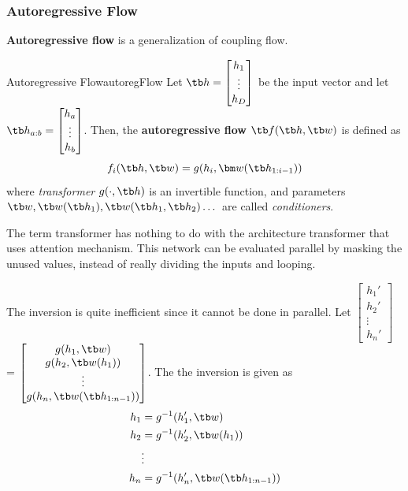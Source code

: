 \documentclass{article}
\begin{document}
            

        \subsubsection{Autoregressive Flow}
            \textbf{Autoregressive flow} is a generalization of coupling flow.
            \begin{defn}{Autoregressive Flow}{autoregFlow}
                Let $\tb h=\begin{bmatrix} h_1 \\ \vdots \\ h_D\end{bmatrix}$ be the input vector
                and let $\tb h_{a:b} = \begin{bmatrix} h_a \\ \vdots \\ h_b\end{bmatrix}$.
                Then, the \textbf{autoregressive flow} $\tb f(\tb h, \tb w)$ is defined as
                \[
                f_i(\tb h, \tb w) = g(h_i,\bm w(\tb h_{1:i - 1}))
                \]
                where \emph{transformer} $g(\cdot, \tb h)$ is an invertible function,
                and parameters $\tb w, \tb w(\tb h_1), \tb w(\tb h_1, \tb h_2)\dots$ are
                called \emph{conditioners}.
            \end{defn}
            The term transformer has nothing to do with the architecture transformer that uses attention mechanism. This network can be evaluated parallel by masking the
            unused values, instead of really dividing the inputs and looping.

            The inversion is quite inefficient since it cannot be done in parallel.
            Let $\begin{bmatrix}
                h_1' \\
                h_2' \\
                \vdots \\
                h_n'
            \end{bmatrix}$ 
            = $\begin{bmatrix}
                g(h_1, \tb w) \\
                g(h_2, \tb w(h_1)) \\
                \vdots \\
                g(h_n, \tb w(\tb h_{1:n-1}))
            \end{bmatrix}$. The the inversion is given as
            \begin{align*}
                h_1 &= g^{-1}(h_1', \tb w) \\
                h_2 &= g^{-1}(h_2', \tb w(h_1)) \\
                &\vdots \\
                h_n &= g^{-1}(h_n', \tb w(\tb h_{1:n-1})) \\
            \end{align*}
\end{document}
